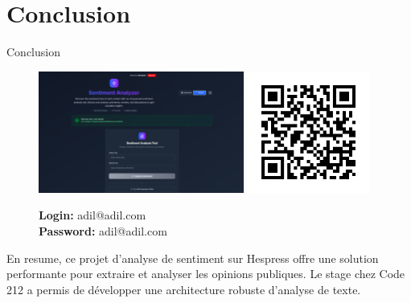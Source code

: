 \section{Conclusion}

\begin{frame}{Conclusion}
    \begin{figure}[H]
        \centering
        \begin{minipage}{0.4\textwidth}
            \centering
            \includegraphics[height=4cm]{assets/images/conclusion-ui.png}
        \end{minipage}
        \hfill
        \begin{minipage}{0.3\textwidth}
            \centering
            \includegraphics[height=4cm]{assets/images/qrcode.png}
        \end{minipage}
        \hfill
        \begin{minipage}{0.2\textwidth}
            \centering
            \vspace{1.5cm}
            \textbf{Login:} adil@adil.com \\
            \textbf{Password:} adil@adil.com
        \end{minipage}
    \end{figure}

    En resume, ce projet d'analyse de sentiment sur Hespress offre une solution performante pour extraire et analyser les opinions publiques. Le stage chez Code 212 a permis de développer une architecture robuste d'analyse de texte.
\end{frame}

